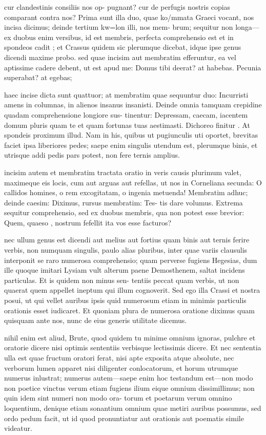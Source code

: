  cur clandestinis consiliis nos op- pugnant? cur de perfugis nostris copias comparant contra nos? Prima sunt illa duo, quae ko/mmata Graeci vocant, nos incisa dicimus; deinde tertium kw=lon illi, nos mem- brum; sequitur non longa—ex duobus enim versibus, id est membris, perfecta comprehensio est et in spondeos cadit ; et Crassus quidem sic plerumque dicebat, idque ipse genus dicendi maxime probo. sed quae incisim aut membratim efferuntur, ea vel aptissime cadere debent, ut est apud me: Domus tibi deerat? at habebas. Pecunia superabat? at egebas;

 haec incise dicta sunt quattuor; at membratim quae sequuntur duo: Incurristi amens in columnas, in alienos insanus insanisti. Deinde omnia tamquam crepidine quadam comprehensione longiore sus- tinentur: Depressam, caecam, iacentem domum pluris quam te et quam fortunas tuas aestimasti. Dichoreo finitur . At spondeis proximum illud. Nam in his, quibus ut pugiunculis uti oportet, brevitas faciet ipsa liberiores pedes; saepe enim singulis utendum est, plerumque binis, et utrisque addi pedis pars potest, non fere ternis amplius.

 incisim autem et membratim tractata oratio in veris causis plurimum valet, maximeque eis locis, cum aut arguas aut refellas, ut nos in Corneliana secunda: O callidos homines, o rem excogitatam, o ingenia metuenda! Membratim adhuc; deinde caesim: Diximus, rursus membratim: Tes- tis dare volumus. Extrema sequitur comprehensio, sed ex duobus membris, qua non potest esse brevior: Quem, quaeso , nostrum fefellit ita vos esse facturos?

 nec ullum genus est dicendi aut melius aut fortius quam binis aut ternis ferire verbis, non numquam singulis, paulo alias pluribus, inter quae variis clausulis interponit se raro numerosa comprehensio; quam perverse fugiens Hegesias, dum ille quoque imitari Lysiam vult alterum paene Demosthenem, saltat incidens particulas. Et is quidem non minus sen- tentiis peccat quam verbis, ut non quaerat quem appellet ineptum qui illum cognoverit. Sed ego illa Crassi et nostra posui, ut qui vellet auribus ipsis quid numerosum etiam in minimis particulis orationis esset iudicaret. Et quoniam plura de numerosa oratione diximus quam quisquam ante nos, nunc de eius generis utilitate dicemus.

 nihil enim est aliud, Brute, quod quidem tu minime omnium ignoras, pulchre et oratorie dicere nisi optimis sententiis verbisque lectissimis dicere. Et nec sententia ulla est quae fructum oratori ferat, nisi apte exposita atque absolute, nec verborum lumen apparet nisi diligenter conlocatorum, et horum utrumque numerus inlustrat; numerus autem—saepe enim hoc testandum est—non modo non poetice vinctus verum etiam fugiens ilium eique omnium dissimillimus; non quin idem sint numeri non modo ora- torum et poetarum verum omnino loquentium, denique etiam sonantium omnium quae metiri auribus possumus, sed ordo pedum facit, ut id quod pronuntiatur aut orationis aut poematis simile videatur.

